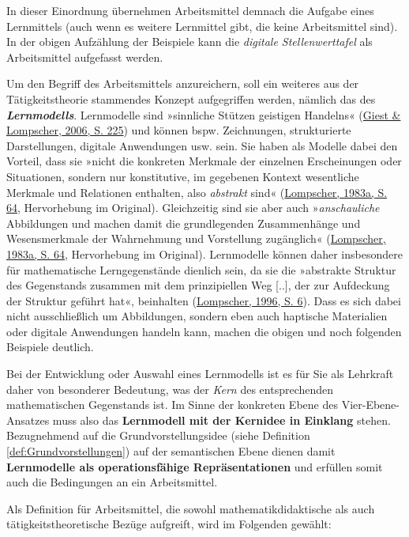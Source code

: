 \documentclass[
]{scrbook}
\theoremstyle{definition}
\theoremstyle{definition}
\theoremstyle{definition}
\theoremstyle{definition}
\theoremstyle{remark}
\begin{document}
In dieser Einordnung übernehmen Arbeitsmittel demnach die Aufgabe eines Lernmittels (auch wenn es weitere Lernmittel gibt, die keine Arbeitsmittel sind). In der obigen Aufzählung der Beispiele kann die \emph{digitale Stellenwerttafel} als Arbeitsmittel aufgefasst werden.

Um den Begriff des Arbeitsmittels anzureichern, soll ein weiteres aus der Tätigkeitstheorie stammendes Konzept aufgegriffen werden, nämlich das des \textbf{\emph{Lernmodells}}. Lernmodelle sind »sinnliche Stützen geistigen Handelns« (\protect\hyperlink{ref-Giest2006}{Giest \& Lompscher, 2006, S. 225}) und können bspw. Zeichnungen, strukturierte Darstellungen, digitale Anwendungen usw. sein. Sie haben als Modelle dabei den Vorteil, dass sie »nicht die konkreten Merkmale der einzelnen Erscheinungen oder Situationen, sondern nur konstitutive, im gegebenen Kontext wesentliche Merkmale und Relationen enthalten, also \emph{abstrakt} sind« (\protect\hyperlink{ref-Lompscher1983a}{Lompscher, 1983a, S. 64}, Hervorhebung im Original). Gleichzeitig sind sie aber auch »\emph{anschauliche} Abbildungen und machen damit die grundlegenden Zusammenhänge und Wesensmerkmale der Wahrnehmung und Vorstellung zugänglich« (\protect\hyperlink{ref-Lompscher1983a}{Lompscher, 1983a, S. 64}, Hervorhebung im Original). Lernmodelle können daher insbesondere für mathematische Lerngegenstände dienlich sein, da sie die »abstrakte Struktur des Gegenstands zusammen mit dem prinzipiellen Weg {[}..{]}, der zur Aufdeckung der Struktur geführt hat«, beinhalten (\protect\hyperlink{ref-Lompscher1996}{Lompscher, 1996, S. 6}). Dass es sich dabei nicht ausschließlich um Abbildungen, sondern eben auch haptische Materialien oder digitale Anwendungen handeln kann, machen die obigen und noch folgenden Beispiele deutlich.

Bei der Entwicklung oder Auswahl eines Lernmodells ist es für Sie als Lehrkraft daher von besonderer Bedeutung, was der \emph{Kern} des entsprechenden mathematischen Gegenstands ist. Im Sinne der \textcolor{concreteColor}{konkreten Ebene} des Vier-Ebene-Ansatzes muss also das \textbf{Lernmodell mit der Kernidee in Einklang} stehen. Bezugnehmend auf die Grundvorstellungsidee (siehe Definition \ref{def:Grundvorstellungen}) auf der \textcolor{semanticColor}{semantischen Ebene} dienen damit \textbf{Lernmodelle als operationsfähige Repräsentationen} und erfüllen somit auch die Bedingungen an ein Arbeitsmittel.

Als Definition für Arbeitsmittel, die sowohl mathematikdidaktische als auch tätigkeitstheoretische Bezüge aufgreift, wird im Folgenden gewählt:
\end{document}
